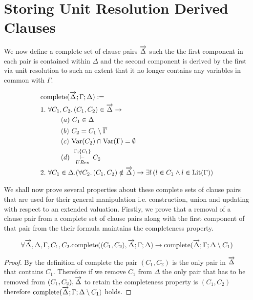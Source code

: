\section{Storing Unit Resolution Derived Clauses}

We now define a complete set of clause pairs $\overrightarrow{\Delta}$ such the the first component in each pair is contained within $\Delta$ and the second component is derived by the first via unit resolution to such an extent that it no longer contains any variables in common with $\Gamma$. \\
\medskip
\begin{mydef}
\begin{align*}
 &\mathrm{complete}(\overrightarrow{\Delta};\Gamma; \Delta) :=  \\
& 1. \ \forall C_1,C_2.  \, (C_1, C_2) \in \overrightarrow{\Delta} \to \\
& \hspace{30pt}  (a) \ C_1 \in \Delta \\
& \hspace{30pt}  (b) \ C_2 = C_1 \setminus \overline{\Gamma} \\
& \hspace{30pt}  (c) \ \mathrm{Var}(C_2) \cap \mathrm{Var}(\Gamma) = \emptyset \\
& \hspace{30pt}  (d) \  \overset{\Gamma;\{C_1 \}}{\underset{URes}{\vdash}} C_2 \\
&2. \ \forall C_1 \in \Delta. (\forall C_2. \, (C_1, C_2 ) \notin \overrightarrow{\Delta}) \to \exists l \, (l \in C_1 \wedge l \in \mathrm{Lit}(\Gamma))
\end{align*}

\end{mydef}

We shall now prove several properties about these complete sets of clause pairs that are used for their general manipulation i.e. construction, union and updating with respect to an extended valuation. Firstly, we prove that a removal of a clause pair from a complete set of clause pairs along with the first component of that pair from the their formula maintains the completeness property. \\
\medskip
\begin{mylemma}\label{lem:comprem}
\begin{align*}
\forall \overrightarrow{\Delta},\Delta,\Gamma,C_1,C_2. \mathrm{complete}((C_1, C_2), \overrightarrow{\Delta};\Gamma; \Delta) \to \mathrm{complete}(\overrightarrow{\Delta};\Gamma; \Delta \setminus C_1)
\end{align*}
\begin{proof}
By the definition of complete the pair $(C_1, C_2)$ is the only pair in $\overrightarrow{\Delta}$ that contains $C_1$.  Therefore if we remove $C_1$ from $\Delta$ the only pair that has to be removed from $(C_1, C_2), \overrightarrow{\Delta}$ to retain the completeness property is $(C_1,C_2)$ therefore $\mathrm{complete}(\overrightarrow{\Delta};\Gamma; \Delta \setminus C_1)$ holds.
\end{proof}
\end{mylemma}

